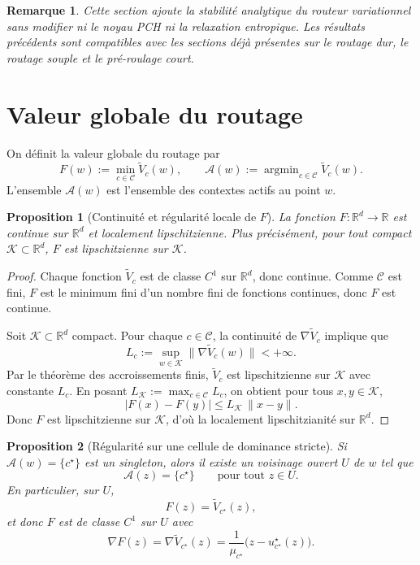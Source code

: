 \documentclass[11pt,a4paper]{article}
\newtheorem{proposition}{Proposition}[section]
\newtheorem{remark}{Remarque}[section]
\DeclareMathOperator{\argmin}{argmin}
\newcommand{\R}{\mathbb R}
\newcommand{\Ccal}{\mathcal C}
\begin{document}
\begin{remark}
Cette section ajoute la stabilité analytique du routeur variationnel sans modifier ni le noyau PCH ni la relaxation entropique. Les résultats précédents sont compatibles avec les sections déjà présentes sur le routage dur, le routage souple et le pré-roulage court.
\end{remark}


\section{Valeur globale du routage}

On définit la valeur globale du routage par
\[
F(w):=\min_{c\in\Ccal}\widetilde V_c(w),
\qquad
\mathcal A(w):=\argmin_{c\in\Ccal}\widetilde V_c(w).
\]
L'ensemble \(\mathcal A(w)\) est l'ensemble des contextes actifs au point \(w\).

\begin{proposition}[Continuité et régularité locale de \(F\)]
La fonction \(F:\R^d\to\R\) est continue sur \(\R^d\) et localement lipschitzienne.
Plus précisément, pour tout compact \(\mathcal K\subset\R^d\), \(F\) est lipschitzienne sur \(\mathcal K\).
\end{proposition}

\begin{proof}
Chaque fonction \(\widetilde V_c\) est de classe \(C^1\) sur \(\R^d\), donc continue.
Comme \(\Ccal\) est fini, \(F\) est le minimum fini d'un nombre fini de fonctions continues, donc \(F\) est continue.

Soit \(\mathcal K\subset\R^d\) compact. Pour chaque \(c\in\Ccal\), la continuité de \(\nabla \widetilde V_c\) implique que
\[
L_c:=\sup_{w\in\mathcal K}\|\nabla \widetilde V_c(w)\|<+\infty.
\]
Par le théorème des accroissements finis, \(\widetilde V_c\) est lipschitzienne sur \(\mathcal K\) avec constante \(L_c\).
En posant \(L_{\mathcal K}:=\max_{c\in\Ccal}L_c\), on obtient pour tous \(x,y\in\mathcal K\),
\[
|F(x)-F(y)|
\le
L_{\mathcal K}\,\|x-y\|.
\]
Donc \(F\) est lipschitzienne sur \(\mathcal K\), d'où la localement lipschitzianité sur \(\R^d\).
\end{proof}

\begin{proposition}[Régularité sur une cellule de dominance stricte]
Si \(\mathcal A(w)=\{c^\star\}\) est un singleton, alors il existe un voisinage ouvert \(U\) de \(w\) tel que
\[
\mathcal A(z)=\{c^\star\}
\qquad\text{pour tout }z\in U.
\]
En particulier, sur \(U\),
\[
F(z)=\widetilde V_{c^\star}(z),
\]
et donc \(F\) est de classe \(C^1\) sur \(U\) avec
\[
\nabla F(z)=\nabla \widetilde V_{c^\star}(z)
=\frac{1}{\mu_{c^\star}}\bigl(z-u_{c^\star}^\star(z)\bigr).
\]
\end{proposition}
\end{document}
